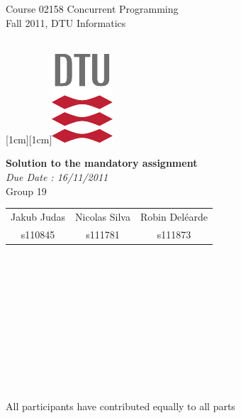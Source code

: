 \documentclass[a4paper,12pt,twoside]{article}
\begin{document}
\noindent\parbox[t]{9cm}{\textsf{Course 02158 Concurrent Programming\\
Fall 2011, DTU Informatics }}
\hfill
\parbox[t]{1cm}{\mbox{}\\
\raisebox{0.0cm}[1cm][1cm]{\includegraphics[origin=lb]{dtu_logo_cmyk.pdf}}}

\vspace{2cm}

\begin{center}
{\Large \bf Solution to the mandatory assignment}\\
\vspace{0.3cm}
{\it Due Date : 16/11/2011}\\
\vspace{1cm}
{\Large Group 19}\\
\vspace{0.3cm}
\begin{tabular}{ccc}
{\large Jakub Judas}&{\large Nicolas Silva}&{\large Robin Del\'earde}\\
s110845&s111781&s111873
\end{tabular}\\
\end{center}
~\\~\\~\\~\\~\\~\\~\\~\\
\begin{center}
All participants have contributed equally to all parts
\end{center}
\newpage










\end{document}

